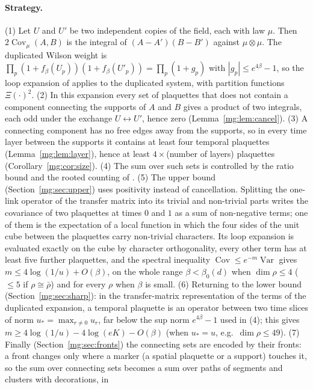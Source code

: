 \documentclass[11pt,a4paper]{article}
\theoremstyle{definition}
\theoremstyle{remark}
\DeclareMathOperator{\Cov}{Cov}
\DeclareMathOperator{\Var}{Var}
\begin{document}
\paragraph{Strategy.} (1) Let $U$ and $U'$ be two independent copies of the field, each with law $\mu$. Then
$2\Cov_\mu(A,B)$ is the integral of $(A-A')(B-B')$ against $\mu\otimes\mu$. The duplicated Wilson weight is
$\prod_p(1+f_\beta(U_p))(1+f_\beta(U'_p))=\prod_p(1+g_p)$ with $|g_p|\le e^{4\beta}-1$, so the loop expansion of
\cite{III} applies to the duplicated system, with partition functions $\Xi(\cdot)^2$. (2) In this expansion every set of
plaquettes that does not contain a component connecting the supports of $A$ and $B$ gives a product of two integrals, each
odd under the exchange $U\leftrightarrow U'$, hence zero (Lemma~\ref{mg:lem:cancel}). (3) A connecting component has no
free edges away from the supports, so in every time layer between the supports it contains at least four temporal plaquettes
(Lemma~\ref{mg:lem:layer}), hence at least $4\times$(number of layers) plaquettes (Corollary~\ref{mg:cor:size}). (4) The sum
over such sets is controlled by the ratio bound and the rooted counting of \cite{III}. (5) The upper bound (Section~\ref{mg:sec:upper})
uses positivity instead of cancellation. Splitting the one-link operator of the transfer matrix into its trivial and non-trivial parts
writes the covariance of two plaquettes at times $0$ and $1$ as a sum of non-negative terms; one of them is the expectation of a local
function in which the four sides of the unit cube between the plaquettes carry non-trivial characters. Its loop expansion is evaluated
exactly on the cube by character orthogonality, every other term has at least five further plaquettes, and the spectral inequality
$\Cov\le e^{-m}\Var$ gives $m\le4\log(1/u)+O(\beta)$, on the whole range $\beta<\beta_0(d)$ when $\dim\rho\le4$ ($\le5$ if $\rho\cong\bar\rho$)
and for every $\rho$ when $\beta$ is small. (6) Returning to the lower bound (Section~\ref{mg:sec:sharp}): in the transfer-matrix
representation of the terms of the duplicated expansion, a temporal plaquette is an operator between two time slices of norm
$u_*=\max_{r\neq0}u_r$, far below the sup norm $e^{4\beta}-1$ used in (4); this gives $m\ge4\log(1/u)-4\log(eK)-O(\beta)$ (when $u_*=u$, e.g.\
$\dim\rho\le49$). (7) Finally (Section~\ref{mg:sec:fronts}) the connecting sets are encoded by their fronts: a front changes only where a marker (a
spatial plaquette or a support) touches it, so the sum over connecting sets becomes a sum over paths of segments and clusters with decorations, in
\end{document}
